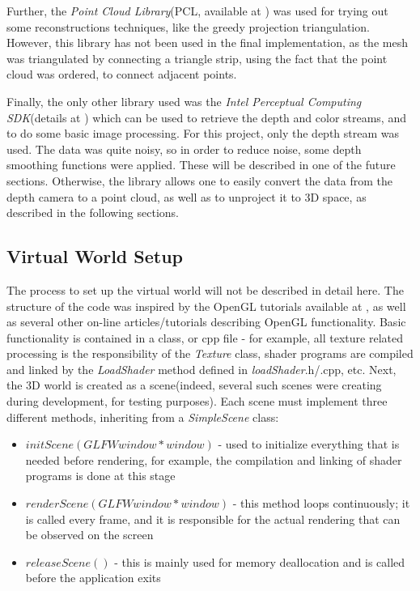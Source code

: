 \documentclass[]{article}
\begin{document}
Further, the \textit{Point Cloud Library}(PCL, available at \cite{PCL}) was used for trying out some reconstructions techniques, like the greedy projection triangulation. However, this library has not been used in the final implementation, as the mesh was triangulated by connecting a triangle strip, using the fact that the point cloud was ordered, to connect adjacent points.

Finally, the only other library used was the \textit{Intel Perceptual Computing SDK}(details at \cite{PCSDK}) which can be used to retrieve the depth and color streams, and to do some basic image processing. For this project, only the depth stream was used. The data was quite noisy, so in order to reduce noise, some depth smoothing functions were applied. These will be described in one of the future sections. Otherwise, the library allows one to easily convert the data from the depth camera to a point cloud, as well as to unproject it to 3D space, as described in the following sections.

\subsection{Virtual World Setup}


The process to set up the virtual world will not be described in detail here. The structure of the code was inspired by the OpenGL tutorials available at \cite{OpenGLTuts}, as well as several other on-line articles/tutorials describing OpenGL functionality. Basic functionality is contained in a class, or cpp file - for example, all texture related processing is the responsibility of the \textit{Texture} class, shader programs are compiled and linked by the \textit{LoadShader} method defined in \textit{loadShader}.h/.cpp, etc. Next, the 3D world is created as a scene(indeed, several such scenes were creating during development, for testing purposes). Each scene must implement three different methods, inheriting from a \textit{SimpleScene} class:
\begin{itemize}
\item $initScene(GLFWwindow *window)$ - used to initialize everything that is needed before rendering, for example, the compilation and linking of shader programs is done at this stage
\item $renderScene(GLFWwindow *window)$ - this method loops continuously; it is called every frame, and it is responsible for the actual rendering that can be observed on the screen
\item $releaseScene()$ - this is mainly used for memory deallocation and is called before the application exits
\end{itemize}
\end{document}
